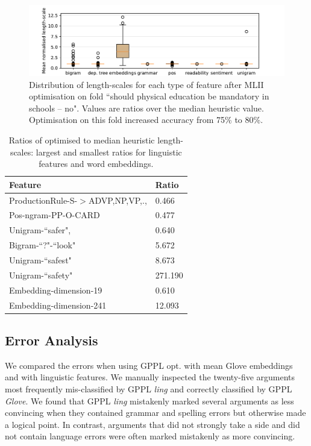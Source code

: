 \begin{figure}[h]
\includegraphics[width=\columnwidth, clip=True, trim=32 0 57 0]{figures/features/boxplot}
\caption{Distribution of length-scales for each type of feature after MLII optimisation 
on fold ``should physical education be mandatory in schools -- no". 
Values are ratios over the median heuristic value. 
Optimisation on this fold increased accuracy from 75\% to 80\%. }
\label{fig:boxplot}
\end{figure}
\begin{table}
\small
  \begin{tabularx}{\columnwidth}{l | X }
  Feature & Ratio\\
  \hline
  ProductionRule-S-$>$ADVP,NP,VP,., & 0.466 \nonumber\\
  Pos-ngram-PP-O-CARD & 0.477 \nonumber\\
  Unigram-``safer", & 0.640 \nonumber\\
  \hline
  Bigram-``?"-``look" & 5.672 \nonumber\\
  Unigram-``safest" & 8.673 \nonumber\\
  Unigram-``safety" & 271.190 \nonumber\\
  \hline
  Embedding-dimension-19 & 0.610 \nonumber\\
  \hline
  Embedding-dimension-241 & 12.093 \nonumber\\
  \end{tabularx}
  \caption{Ratios of optimised to median heuristic length-scales: largest and smallest
  ratios for linguistic features and word embeddings.}
  \label{tab:extreme_features}
\end{table}


\subsection{Error Analysis}

We compared the errors when using GPPL opt. with mean Glove embeddings
and with linguistic features. We
manually inspected the twenty-five arguments most frequently
mis-classified by GPPL \emph{ling} and correctly classified by GPPL \emph{Glove}.
We found that GPPL \emph{ling} mistakenly marked several arguments 
as less convincing when they contained grammar and spelling errors but otherwise
made a logical point. 
In contrast, arguments that did not strongly take a side and did not contain 
language errors were often marked mistakenly as more convincing.

